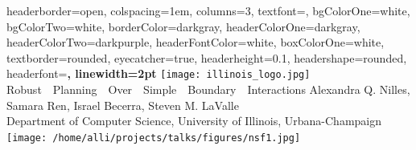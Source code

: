 \documentclass[landscape,a0paper,fontscale=0.3]{baposter} %
\begin{document}
\begin{poster}
{
headerborder=open, %
colspacing=1em, %
columns=3,
textfont=\Large,
bgColorOne=white, %
bgColorTwo=white, %
borderColor=darkgray, %
headerColorOne=darkgray, %
headerColorTwo=darkpurple, %
headerFontColor=white, %
boxColorOne=white, %
textborder=rounded, %
eyecatcher=true, %
headerheight=0.1\textheight, %
headershape=rounded, %
headerfont=\huge\bf\textsc, %
linewidth=2pt %
}
%
{\texttt{[image: illinois\_logo.jpg]}} %
{{Robust~~Planning~~Over~~Simple~~Boundary~~Interactions}\vspace{-0.0em}}
{Alexandra Q. Nilles, Samara Ren, Israel Becerra, Steven M. LaValle  \hspace{15pt}\\ Department of Computer Science, University of Illinois, Urbana-Champaign} %
{\texttt{[image: /home/alli/projects/talks/figures/nsf1.jpg]}} %



\end{poster}
\end{document}
